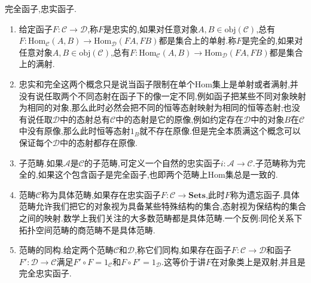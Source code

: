 完全函子,忠实函子.
\begin{enumerate}
	\item 给定函子$F:\mathscr{C}\to\mathscr{D}$,称$F$是忠实的,如果对任意对象$A,B\in\mathrm{obj}(\mathscr{C})$,总有$F:\mathrm{Hom}_{\mathscr{C}}(A,B)\to\mathrm{Hom}_{\mathscr{D}}(FA,FB)$都是集合上的单射.称$F$是完全的,如果对任意对象$A,B\in\mathrm{obj}(\mathscr{C})$,总有$F:\mathrm{Hom}_{\mathscr{C}}(A,B)\to\mathrm{Hom}_{\mathscr{D}}(FA,FB)$都是集合上的满射.
	\item 忠实和完全这两个概念只是说当函子限制在单个Hom集上是单射或者满射,并没有说任取两个不同态射在函子下的像一定不同,例如函子把某些不同对象映射为相同的对象,那么此时必然会把不同的恒等态射映射为相同的恒等态射;也没有说任取$\mathscr{D}$中的态射总有$\mathscr{C}$中的态射是它的原像,例如约定存在$\mathscr{D}$中的对象$B$在$\mathscr{C}$中没有原像,那么此时恒等态射$1_B$就不存在原像.但是完全本质满这个概念可以保证每个$\mathscr{D}$中的态射都存在原像.
	\item 子范畴.如果$\mathscr{A}$是$\mathscr{C}$的子范畴,可定义一个自然的忠实函子$i:\mathscr{A}\to\mathscr{C}$.子范畴称为完全的,如果这个包含函子是完全函子,也即两个范畴上Hom集总是一致的.
	\item 范畴$\mathscr{C}$称为具体范畴,如果存在忠实函子$F:\mathscr{C}\to\textbf{Sets}$,此时$F$称为遗忘函子.具体范畴允许我们把它的对象视为具备某些特殊结构的集合,态射视为保结构的集合之间的映射.数学上我们关注的大多数范畴都是具体范畴.一个反例:同伦关系下拓扑空间范畴的商范畴不是具体范畴.
	\item 范畴的同构.给定两个范畴$\mathscr{C}$和$\mathscr{D}$,称它们同构,如果存在函子$F:\mathscr{C}\to\mathscr{D}$和函子$F':\mathscr{D}\to\mathscr{C}$满足$F'\circ F=1_{\mathscr{C}}$和$F\circ F'=1_{\mathscr{D}}$.这等价于讲$F$在对象类上是双射,并且是完全忠实函子.
\end{enumerate}

